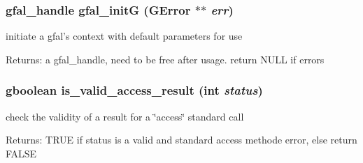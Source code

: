 \subsubsection{\setlength{\rightskip}{0pt plus 5cm}gfal\_\-handle gfal\_\-init\-G (GError $\ast$$\ast$ {\em err})}\label{gfal__common__internal_8h_8410ba458f920d8f8a8f0e5594170fe4}


initiate a gfal's context with default parameters for use \begin{Desc}
\item[Returns:]a gfal\_\-handle, need to be free after usage. return NULL if errors \end{Desc}
\subsubsection{\setlength{\rightskip}{0pt plus 5cm}gboolean is\_\-valid\_\-access\_\-result (int {\em status})}\label{gfal__common__internal_8h_aed64917ebc1c60ab8ccd2c4dfbd2c3a}


check the validity of a result for a \char`\"{}access\char`\"{} standard call \begin{Desc}
\item[Returns:]TRUE if status is a valid and standard access methode error, else return FALSE \end{Desc}
